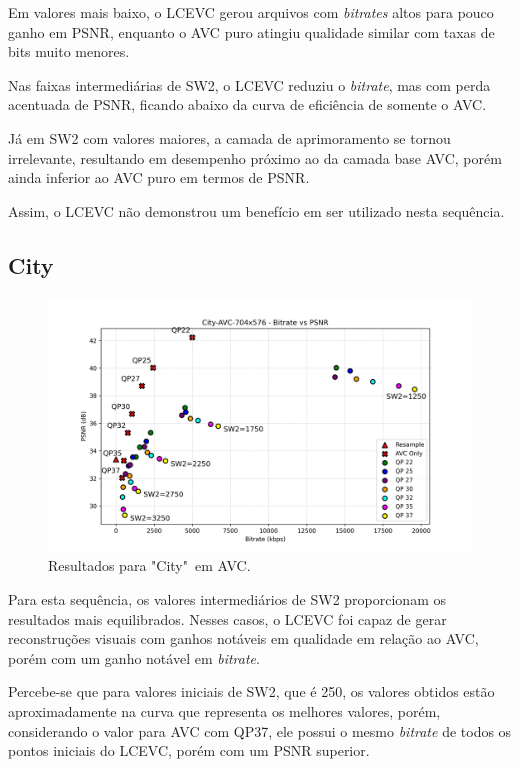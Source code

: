 Em valores mais baixo, o \acrshort{LCEVC} gerou arquivos com \textit{bitrates} altos
para pouco ganho em \acrshort{PSNR}, enquanto o \acrshort{AVC} puro atingiu qualidade
similar com taxas de bits muito menores.

Nas faixas intermediárias de SW2, o \acrshort{LCEVC} reduziu o \textit{bitrate}, mas
com perda acentuada de \acrshort{PSNR}, ficando abaixo da curva de eficiência de somente
o \acrshort{AVC}.

Já em SW2 com valores maiores, a camada de aprimoramento se tornou irrelevante, resultando em
desempenho próximo ao da camada base \acrshort{AVC}, porém ainda inferior ao \acrshort{AVC} puro
em termos de \acrshort{PSNR}. 

Assim, o \acrshort{LCEVC} não demonstrou um benefício em ser utilizado nesta sequência.

\newpage
\subsection{City}

\begin{figure}[h]
    \centering
    \includegraphics[width=1.0\textwidth]{img/City-AVC.png}
    \caption{Resultados para "City"\ em \acrshort{AVC}. \cite{xiph}}
    \label{fig:City}
\end{figure}

Para esta sequência, os valores intermediários de SW2 proporcionam os resultados mais equilibrados.
Nesses casos, o \acrshort{LCEVC} foi capaz de gerar reconstruções visuais com ganhos notáveis
em qualidade em relação ao \acrshort{AVC}, porém com um ganho notável em \textit{bitrate}.

Percebe-se que para valores iniciais de SW2, que é 250, os valores
obtidos estão aproximadamente na curva que representa os melhores valores, porém, considerando
o valor para \acrshort{AVC} com QP37, ele possui o mesmo \textit{bitrate} de todos os pontos
iniciais do \acrshort{LCEVC}, porém com um \acrshort{PSNR} superior.

